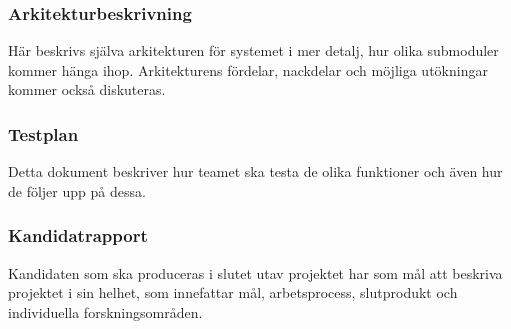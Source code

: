 \subsubsection*{Arkitekturbeskrivning}
Här beskrivs själva arkitekturen för systemet i mer detalj, hur olika submoduler kommer hänga ihop. Arkitekturens fördelar, nackdelar och möjliga utökningar kommer också diskuteras.

\subsubsection*{Testplan}
Detta dokument beskriver hur teamet ska testa de olika funktioner och även hur de följer upp på
dessa.

\subsubsection*{Kandidatrapport}
Kandidaten som ska produceras i slutet utav projektet har som mål att beskriva projektet i
sin helhet, som innefattar mål, arbetsprocess, slutprodukt och individuella forskningsområden.

